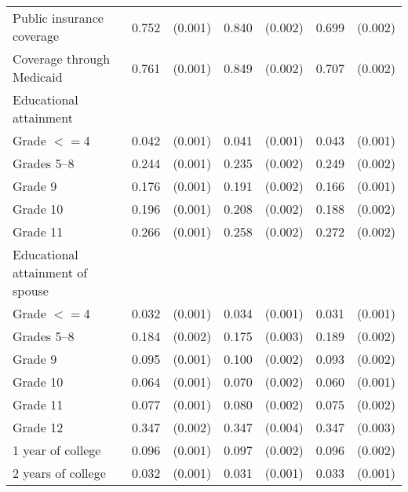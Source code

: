\begin{tabular}{lcccccc}
 \hspace{0.3cm}  Public insurance coverage   & 0.752 & (0.001)  & 0.840 & (0.002)  & 0.699 & (0.002)  \\
 \hspace{0.3cm}  Coverage through Medicaid   & 0.761 & (0.001)  & 0.849 & (0.002)  & 0.707 & (0.002)  \\
 Educational attainment   & & &  \\
 \hspace{0.3cm} Grade $<=$4   & 0.042 & (0.001)  & 0.041 & (0.001)  & 0.043 & (0.001)  \\
 \hspace{0.3cm}  Grades 5--8   & 0.244 & (0.001)  & 0.235 & (0.002)  & 0.249 & (0.002)  \\
 \hspace{0.3cm} Grade 9   & 0.176 & (0.001)  & 0.191 & (0.002)  & 0.166 & (0.001)  \\
 \hspace{0.3cm} Grade 10   & 0.196 & (0.001)  & 0.208 & (0.002)  & 0.188 & (0.002)  \\
 \hspace{0.3cm} Grade 11   & 0.266 & (0.001)  & 0.258 & (0.002)  & 0.272 & (0.002)  \\
 Educational attainment of spouse   & & &  \\
 \hspace{0.3cm} Grade $<=$4   & 0.032 & (0.001)  & 0.034 & (0.001)  & 0.031 & (0.001)  \\
 \hspace{0.3cm}  Grades 5--8   & 0.184 & (0.002)  & 0.175 & (0.003)  & 0.189 & (0.002)  \\
 \hspace{0.3cm} Grade 9   & 0.095 & (0.001)  & 0.100 & (0.002)  & 0.093 & (0.002)  \\
 \hspace{0.3cm} Grade 10   & 0.064 & (0.001)  & 0.070 & (0.002)  & 0.060 & (0.001)  \\
 \hspace{0.3cm} Grade 11   & 0.077 & (0.001)  & 0.080 & (0.002)  & 0.075 & (0.002)  \\
 \hspace{0.3cm} Grade 12   & 0.347 & (0.002)  & 0.347 & (0.004)  & 0.347 & (0.003)  \\
 \hspace{0.3cm} 1 year of college   & 0.096 & (0.001)  & 0.097 & (0.002)  & 0.096 & (0.002)  \\
 \hspace{0.3cm} 2 years of college   & 0.032 & (0.001)  & 0.031 & (0.001)  & 0.033 & (0.001)  \\

\end{tabular}
